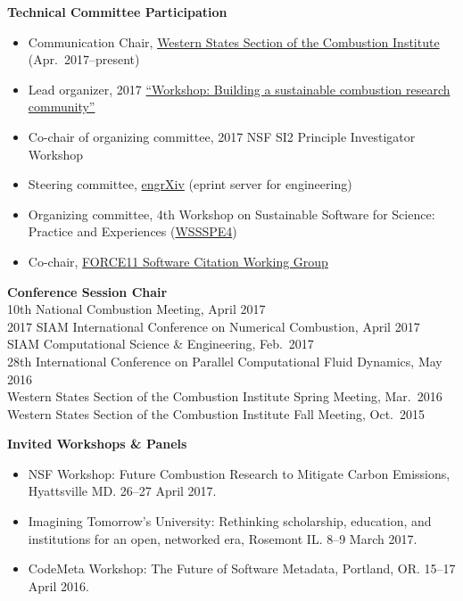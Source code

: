 \documentclass[margin,line,11pt]{res}
\begin{document}
\begin{resume}
\textbf{Technical Committee Participation}
\begin{itemize}[leftmargin=*]
\item Communication Chair, \href{http://wssci.us/}{Western States Section of the Combustion Institute} (Apr.~2017--present)
\item Lead organizer, 2017 \href{https://combustion-community-workshop-2017.github.io/}{``Workshop: Building a sustainable combustion research community''}
\item Co-chair of organizing committee, 2017 NSF SI2 Principle Investigator Workshop
\item Steering committee, \href{http://blog.engrxiv.org/}{engrXiv} (eprint server for engineering)
\item Organizing committee, 4th Workshop on Sustainable Software for Science: Practice and Experiences (\href{http://wssspe.researchcomputing.org.uk/wssspe4/}{WSSSPE4})
\item Co-chair, \href{https://www.force11.org/group/software-citation-working-group}{FORCE11 Software Citation Working Group}
\end{itemize}

\textbf{Conference Session Chair} \\
10th National Combustion Meeting, April 2017 \\
2017 SIAM International Conference on Numerical Combustion, April 2017 \\
SIAM Computational Science \& Engineering, Feb.\ 2017 \\
28th International Conference on Parallel Computational Fluid Dynamics, May 2016 \\
Western States Section of the Combustion Institute Spring Meeting, Mar.\ 2016 \\
Western States Section of the Combustion Institute Fall Meeting, Oct.\ 2015

\textbf{Invited Workshops \& Panels}
\begin{itemize}[leftmargin=*]
    \item NSF Workshop: Future Combustion Research to Mitigate Carbon Emissions, Hyattsville MD. 26--27 April 2017.
    \item Imagining Tomorrow's University: Rethinking scholarship, education, and institutions for an open, networked era, Rosemont IL. 8--9 March 2017.
    \item CodeMeta Workshop: The Future of Software Metadata, Portland, OR. 15--17 April 2016.
\end{itemize}


\end{resume}
\end{document}
